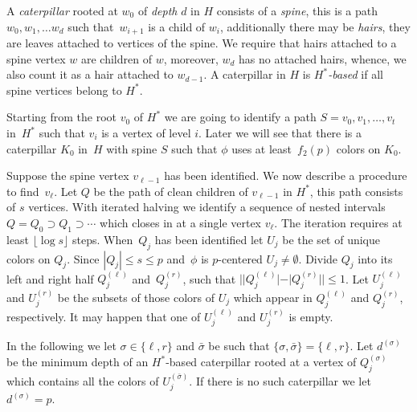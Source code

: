 A \emph{caterpillar} rooted at $w_0$ of \emph{depth} $d$ in $H$ consists of a
\emph{spine}, this is a path $w_0,w_1,\ldots w_d$ such that~$w_{i+1}$ is a
child of $w_i$, additionally there may be \emph{hairs}, they are leaves
attached to vertices of the spine.  We require that hairs attached to a spine
vertex $w$ are children of $w$, moreover, $w_d$ has no attached hairs, whence,
we also count it as a hair attached to $w_{d-1}$.  A caterpillar in $H$ is
\emph{$H^*$-based} if all spine vertices belong to $H^*$.


Starting from the root $v_0$ of $H^*$ we are going to identify a path
$S=v_0,v_1,\ldots,v_{t}$ in~$H^*$ such that $v_i$ is a vertex of level $i$.
Later we will see that there is a caterpillar $K_0$ in~$H$ with spine $S$ 
such that $\phi$ uses at least~$f_2(p)$ colors on $K_0$. 

Suppose the spine vertex $v_{\ell-1}$ has been identified. We now describe a
procedure to find~$v_\ell$. Let $Q$ be the path of clean children of $v_{\ell-1}$ in
$H^*$, this path consists of $s$ vertices. With iterated halving we identify a
sequence of nested intervals $Q=Q_0\supset Q_1 \supset\cdots$ which closes in
at a single vertex $v_\ell$.  The iteration requires at least $\lfloor\log s\rfloor$ steps.
When~$Q_j$ has been identified let $U_j$ be the set of unique colors on
$Q_j$. Since $|Q_j|\leq s\leq p$ and~$\phi$ is $p$-centered
$U_j\neq\emptyset$. Divide $Q_j$ into its left and right half $Q_j^{(\ell)}$
and~$Q_j^{(r)}$, such that $||Q_j^{(\ell)}| - |Q_j^{(r)}||\leq 1$. Let $U_j^{(\ell)}$ and
$U_j^{(r)}$ be the subsets of those colors of $U_j$ which appear in $Q_j^{(\ell)}$ and $Q_j^{(r)}$,
respectively. It may happen that one of $U_j^{(\ell)}$ and $U_j^{(r)}$ is empty.

In the following we let $\sigma\in\{\ell,r\}$ and $\bar{\sigma}$ be such that
$\{\sigma,\bar{\sigma}\}=\{\ell,r\}$.  Let $d^{(\sigma)}$ be the minimum depth of an
$H^*$-based caterpillar rooted at a vertex of $Q_j^{(\sigma)}$ which contains
all the colors of $U_j^{(\bar{\sigma})}$.  If there is no such caterpillar we let
$d^{(\sigma)}=p$. 

